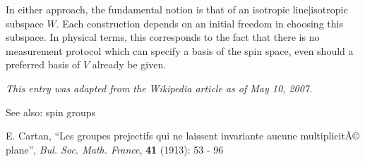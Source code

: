 \documentclass[12pt]{article}
\begin{document}
In either approach, the fundamental notion is that of an isotropic line|isotropic subspace $W$. Each construction depends on an initial freedom in choosing this subspace. In physical terms, this corresponds to the fact that there is no measurement protocol which can specify a basis of the spin space, even should a preferred basis of $V$ already be given.

{\it This entry was adapted from the Wikipedia article  as of May 10, 2007.}

See also: spin groups

\begin{thebibliography}{1}
 E. Cartan, ``Les groupes prejectifs qui ne laissent invariante aucune multiplicitÃ© plane'', {\it Bul. Soc. Math. France}, {\bf 41} (1913): 53 - 96
\end{thebibliography}
\end{document}
